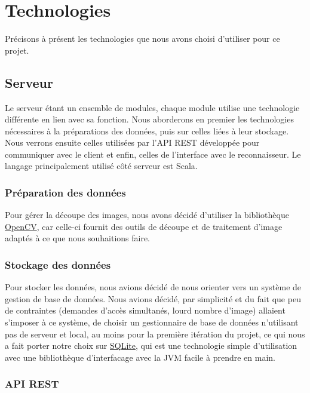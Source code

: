 \section{Technologies}

Précisons à présent les technologies que nous avons choisi d'utiliser pour ce projet.

\subsection{Serveur}

Le serveur étant un ensemble de modules, chaque module utilise une technologie différente en lien avec sa fonction. Nous aborderons en premier les technologies nécessaires à la préparations des données, puis sur celles liées à leur stockage. Nous verrons ensuite celles utilisées par l'API REST développée pour communiquer avec le client et enfin, celles de l'interface avec le reconnaisseur. Le langage principalement utilisé côté serveur est Scala.

\subsubsection{Préparation des données}

Pour gérer la découpe des images, nous avons décidé d'utiliser la bibliothèque \href{https://opencv.org/}{OpenCV}, car celle-ci fournit des outils de découpe et de traitement d'image adaptés à ce que nous souhaitions faire.

\subsubsection{Stockage des données}

Pour stocker les données, nous avions décidé de nous orienter vers un système de gestion de base de données. Nous avions décidé, par simplicité et du fait que peu de contraintes (demandes d'accès simultanés, lourd nombre d'image) allaient s'imposer à ce système, de choisir un gestionnaire de base de données n'utilisant pas de serveur et local, au moins pour la première itération du projet, ce qui nous a fait porter notre choix sur \href{https://www.sqlite.org/index.html}{SQLite}, qui est une technologie simple d'utilisation avec une bibliothèque d'interfacage avec la JVM facile à prendre en main.

\subsubsection{API REST}

